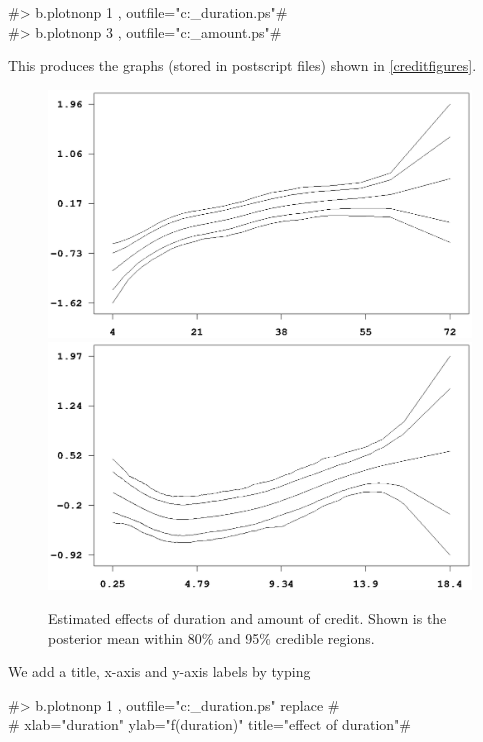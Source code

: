 #> b.plotnonp 1 , outfile="c:\results\credit_duration.ps"#\\
#> b.plotnonp 3 , outfile="c:\results\credit_amount.ps"#

This produces the graphs (stored in postscript files) shown in
\autoref{creditfigures}.

\begin{figure}[ht]
\vspace{0.5cm}
\begin{center}
\includegraphics[scale=0.65]{grafiken/credit_duration.ps}

\vspace{0.5cm}
\includegraphics[scale=0.65]{grafiken/credit_amount.ps}
\end{center}
{\em\caption{ \label{creditfigures} Estimated effects of duration
and amount of credit. Shown is the posterior mean within 80\% and
95\% credible regions.}}
\end{figure}

We add a title, x-axis and y-axis labels by typing \hfill

#> b.plotnonp 1 , outfile="c:\results\credit_duration.ps" replace #\\
#  xlab="duration" ylab="f(duration)" title="effect of duration"#

